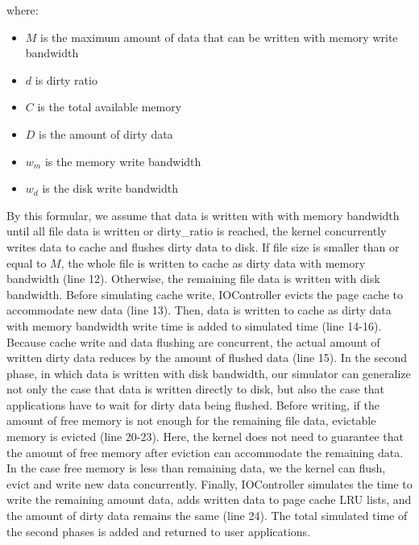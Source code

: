 \documentclass[conference]{IEEEtran}
\begin{document}
			where:
			\begin{itemize}
				\item $M$ is the maximum amount of data that can be written with memory 
				write bandwidth
				\item $d$ is dirty ratio
				\item $C$ is the total available memory
				\item $D$ is the amount of dirty data
				\item $w_m$ is the memory write bandwidth 
				\item $w_d$ is the disk write bandwidth			
			\end{itemize}
			
			By this formular, we assume that data is written with with memory 
			bandwidth until all file data is written or dirty\_ratio is reached, 
			the kernel concurrently writes data to cache and flushes dirty data 
			to disk. If file size is smaller than or equal to $M$, the whole file is 
			written to cache as dirty data with memory bandwidth (line 12). Otherwise, 
			the remaining file data is written with disk bandwidth. Before simulating 
			cache write, IOController evicts the page cache to accommodate new data 
			(line 13). Then, data is written to cache as dirty data with memory 
			bandwidth write time is added to simulated time (line 14-16). Because 
			cache write and data flushing are concurrent, the actual amount of written 
			dirty data reduces by the amount of flushed data (line 15). In the 
			second phase, in which data is written with disk bandwidth, our simulator 
			can generalize not only the case that data is written directly to disk, 
			but also the case that applications have to wait for dirty data 
			being flushed. Before writing, if the amount of free memory is not enough 
			for the remaining file data, evictable memory is evicted (line 20-23). 
			Here, the kernel does not need to guarantee that the amount of free 
			memory after eviction can accommodate the remaining data. In the case 
			free memory is less than remaining data, we the kernel can flush, 
			evict and write new data concurrently. Finally, IOController simulates 
			the time to write the remaining amount data, adds written data to 
			page cache LRU lists, and the amount of dirty data remains the same 
			(line 24). The total simulated time of the second phases is added and 
			returned to user applications.
			
\end{document}
